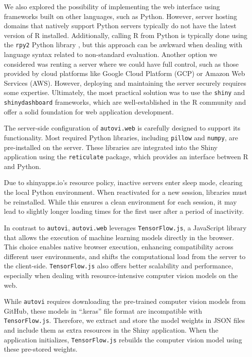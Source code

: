 \documentclass[
doublespace,
  times]{anzsauth}
\begin{document}
We also explored the possibility of implementing the web interface using
frameworks built on other languages, such as Python. However, server
hosting domains that natively support Python servers typically do not
have the latest version of R installed. Additionally, calling R from
Python is typically done using the \texttt{rpy2} Python library
\citep{rpy2}, but this approach can be awkward when dealing with
language syntax related to non-standard evaluation. Another option we
considered was renting a server where we could have full control, such
as those provided by cloud platforms like Google Cloud Platform (GCP) or
Amazon Web Services (AWS). However, deploying and maintaining the server
securely requires some expertise. Ultimately, the most practical
solution was to use the \texttt{shiny} and \texttt{shinydashboard}
frameworks, which are well-established in the R community and offer a
solid foundation for web application development.

The server-side configuration of \texttt{autovi.web} is carefully
designed to support its functionality. Most required Python libraries,
including \texttt{pillow} and \texttt{numpy}, are pre-installed on the
server. These libraries are integrated into the Shiny application using
the \texttt{reticulate} package, which provides an interface between R
and Python.

Due to shinyapps.io's resource policy, inactive servers enter sleep
mode, clearing the local Python environment. When reactivated for a new
session, libraries must be reinstalled. While this ensures a clean
environment for each session, it may lead to slightly longer loading
times for the first user after a period of inactivity.

In contrast to \texttt{autovi}, \texttt{autovi.web} leverages
\texttt{TensorFlow.js}, a JavaScript library that allows the execution
of machine learning models directly in the browser. This choice enables
native browser execution, enhancing compatibility across different user
environments, and shifts the computational load from the server to the
client-side. \texttt{TensorFlow.js} also offers better scalability and
performance, especially when dealing with resource-intensive computer
vision models on the web.

While \texttt{autovi} requires downloading the pre-trained computer
vision models from GitHub, these models in ``.keras'' file format are
incompatible with \texttt{TensorFlow.js}. Therefore, we extract and
store the model weights in JSON files and include them as extra
resources in the Shiny application. When the application initializes,
\texttt{TensorFlow.js} rebuilds the computer vision model using these
pre-stored weights.
\end{document}
